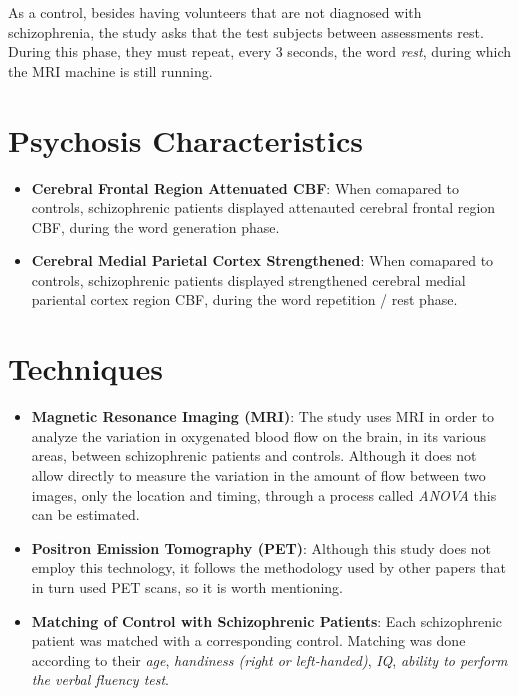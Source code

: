 \documentclass{Paper_Summary}
\begin{document}
    As a control, besides having volunteers that are not diagnosed with schizophrenia, the study asks that the test subjects between assessments rest. During this phase, they must repeat, every 3 seconds, the word \emph{rest}, during which the MRI machine is still running. 

\breakline

\newpage

\section{Psychosis Characteristics}
    \begin{itemize}
        \item \textbf{Cerebral Frontal Region Attenuated CBF}: When comapared to controls, schizophrenic patients displayed attenauted cerebral frontal region CBF, during the word generation phase.
        \item \textbf{Cerebral Medial Parietal Cortex Strengthened}: When comapared to controls, schizophrenic patients displayed strengthened cerebral medial pariental cortex region CBF, during the word repetition / rest phase.
    \end{itemize}

\section{Techniques}
    \begin{itemize}
        \item \textbf{Magnetic Resonance Imaging (MRI)}: The study uses MRI in order to analyze the variation in oxygenated blood flow on the brain, in its various areas, between schizophrenic patients and controls. Although it does not allow directly to measure the variation in the amount of flow between two images, only the location and timing, through a process called \emph{ANOVA} this can be estimated.
        \item \textbf{Positron Emission Tomography (PET)}: Although this study does not employ this technology, it follows the methodology used by other papers that in turn used PET scans, so it is worth mentioning.
        \item \textbf{Matching of Control with Schizophrenic Patients}: Each schizophrenic patient was matched with a corresponding control. Matching was done according to their \emph{age}, \emph{handiness (right or left-handed)}, \emph{IQ}, \emph{ability to perform the verbal fluency test}.
        
    \end{itemize}
\end{document}
